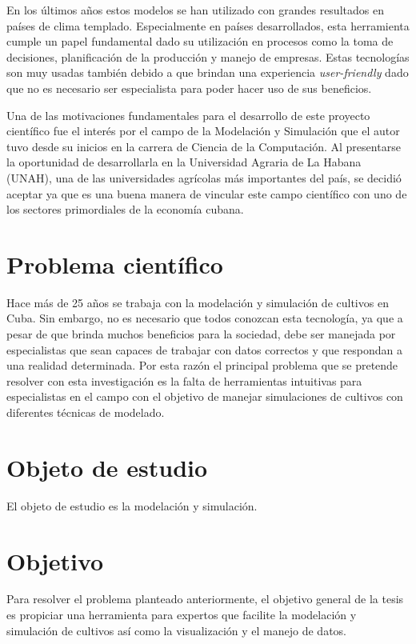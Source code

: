 En los últimos años estos modelos se han utilizado con grandes resultados en países de clima templado. Especialmente en países desarrollados, esta herramienta cumple un papel fundamental dado su utilización en procesos como la toma de decisiones, planificación de la producción y manejo de empresas. Estas tecnologías son muy usadas también debido a que brindan una experiencia \textit{user-friendly} dado que no es necesario ser especialista para poder hacer uso de sus beneficios.

Una de las motivaciones fundamentales para el desarrollo de este proyecto científico fue el interés por el campo de la Modelación y Simulación que el autor tuvo desde su inicios en la carrera de Ciencia de la Computación. Al presentarse la oportunidad de desarrollarla en la Universidad Agraria de La Habana (UNAH), una de las universidades agrícolas más importantes del país, se decidió aceptar ya que es una buena manera de vincular este campo científico con uno de los sectores primordiales de la economía cubana.


\section*{Problema científico}
Hace más de 25 años se trabaja con la modelación y simulación de cultivos en Cuba. Sin embargo, no es necesario que todos conozcan esta tecnología, ya que a pesar de que brinda muchos beneficios para la sociedad, debe ser manejada por especialistas que sean capaces de trabajar con datos correctos y que respondan a una realidad determinada. 
Por esta razón el principal problema que se pretende resolver con esta investigación es la falta de herramientas intuitivas para especialistas en el campo con el objetivo de manejar simulaciones de cultivos con diferentes técnicas de modelado.

\section*{Objeto de estudio}
El objeto de estudio es la modelación y simulación. 

\section*{Objetivo}
Para resolver el problema planteado anteriormente, el objetivo general de la tesis es propiciar una herramienta para expertos que facilite la modelación y simulación de cultivos así como la visualización y el manejo de datos.

